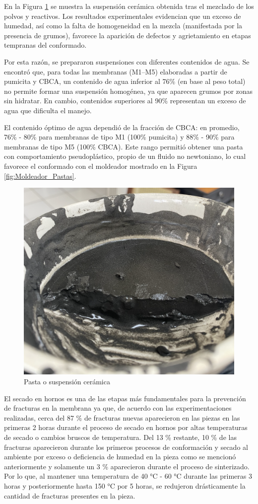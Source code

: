 \documentclass{article}
\begin{document}
En la Figura \ref{fig:Pasta_Cerámica} se muestra la suspensión cerámica obtenida tras el mezclado de los polvos y reactivos. Los resultados experimentales evidencian que un exceso de humedad, así como la falta de homogeneidad en la mezcla (manifestada por la presencia de grumos), favorece la aparición de defectos y agrietamiento en etapas tempranas del conformado.

Por esta razón, se prepararon suspensiones con diferentes contenidos de agua. Se encontró que, para todas las membranas (M1–M5) elaboradas a partir de pumicita y CBCA, un contenido de agua inferior al 76\% (en base al peso total) no permite formar una suspensión homogénea, ya que aparecen grumos por zonas sin hidratar. En cambio, contenidos superiores al 90\% representan un exceso de agua que dificulta el manejo.

El contenido óptimo de agua dependió de la fracción de CBCA: en promedio, 76\% - 80\% para membranas de tipo M1 (100\% pumicita) y 88\% - 90\% para membranas de tipo M5 (100\% CBCA). Este rango permitió obtener una pasta con comportamiento pseudoplástico, propio de un fluido no newtoniano, lo cual favorece el conformado con el moldeador mostrado en la Figura \ref{fig:Moldeador_Pastas}.

\begin{figure}[ht]
    \centering
    \includegraphics[width=0.5\linewidth]{Graphics/Suspension ceramica.png}
    \caption{Pasta o suspensión cerámica}
    \label{fig:Pasta_Cerámica}
\end{figure}

El secado en hornos es una de las etapas más fundamentales para la prevención de fracturas en la membrana ya que, de acuerdo con las experimentaciones realizadas, cerca del 87 \% de fracturas nuevas aparecieron en las piezas en las primeras 2 horas durante el proceso de secado en hornos por altas temperaturas de secado o cambios bruscos de temperatura. Del 13 \% restante, 10 \% de las fracturas aparecieron durante los primeros procesos de conformación y secado al ambiente por exceso o deficiencia de humedad en la pieza como se mencionó anteriormente y solamente un 3 \% aparecieron durante el proceso de sinterizado. Por lo que, al mantener una temperatura de 40 °C - 60 °C durante las primeras 3 horas y posteriormente hasta 150 °C por 5 horas, se redujeron drásticamente la cantidad de fracturas presentes en la pieza. 
 
\end{document}
